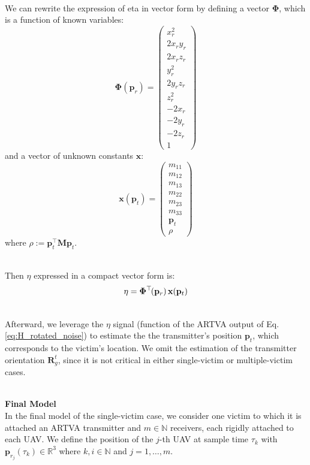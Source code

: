 \documentclass[main]{subfiles}
\begin{document}
\noindent\\
We can rewrite the expression of eta in vector form by defining a vector $\mathbf{\Phi}$,
which is a function of known variables:
\begin{equation}
\renewcommand{\arraystretch}{1}
\mathbf{\Phi}(\mathbf{p}_{r}) = 
\begin{pmatrix}
x_r^2 \\
2x_r y_r \\
2x_r z_r \\
y_r^2 \\
2y_r z_r \\
z_r^2 \\
-2x_r \\
-2y_r \\
-2z_r \\
1
\end{pmatrix}
\label{eq:Phi_vector}
\end{equation}
and a vector of unknown constants $\mathbf{x}$:
\begin{equation}
\renewcommand{\arraystretch}{1}
\mathbf{x}(\mathbf{p}_t) = 
\begin{pmatrix}
m_{11} \\
m_{12} \\
m_{13} \\
m_{22} \\
m_{23} \\
m_{33} \\
\mathbf{p}_t \\
\rho
\end{pmatrix}
\label{eq:x_vector}
\end{equation}  
where \( \rho := \mathbf{p}_t^\top \mathbf{M} \mathbf{p}_t \).

\noindent\\
Then $\eta$ expressed in a compact vector form is:
\begin{equation}
    \eta = \mathbf{\Phi}^\top\mkern-2mu(\mathbf{p}_{r}) \, \mathbf{x}(\mathbf{p}_t)
    \label{eq:eta_final_final}
\end{equation}

\noindent\\
Afterward, we leverage the $\eta$ signal (function of the ARTVA output
of Eq.\ref{eq:H_rotated_noise}) to estimate the
the transmitter’s position \( \mathbf{p}_t \), which corresponds to the victim's location. 
We omit the estimation of the transmitter orientation \( \mathbf{R}_g^t \),
since it is not critical in either single-victim or multiple-victim cases.

\noindent\\
\textbf{Final Model}\noindent\\
In the final model of the single-victim case, we consider one victim to 
which it is attached an ARTVA transmitter and \( m \in \mathbb{N} \) receivers, 
each rigidly attached to each UAV. 
We define the position of the $j$-th UAV at sample time \( \tau_k \) with \( \mathbf{p}_{r_j}(\tau_k) \in \mathbb{R}^3 \) 
where \( k, i \in \mathbb{N} \) and \( j = 1, \ldots, m \).
\end{document}
